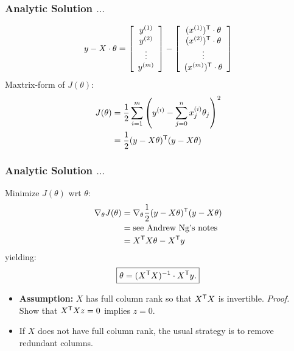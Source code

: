 \documentclass[xcolor=table]{beamer}
\newcommand{\trans}[1]{\ensuremath{#1}^{\scriptsize{\textsf{T}}}}
\begin{document}
\begin{frame}[t]
\frametitle{Analytic Solution $\ldots$}
\[y - X \cdot \theta =  \left [ \begin{array}{c} 
                                    y^{(1)} \\
                                    y^{(2)} \\
                                    \vdots \\
                                    y^{(m)}
                                \end{array}\right ] -
                        \left [ \begin{array}{c}
                                    \trans{(x^{(1)})} \cdot \theta \\
                                    \trans{(x^{(2)})} \cdot \theta \\
                                    \vdots                         \\
                                    \trans{(x^{(m)})} \cdot \theta \\
                                \end{array}
                       \right ]\]
Maxtrix-form of $J(\theta)$:
\begin{equation*}
\begin{split}
    J(\theta) & = \frac{1}{2} \sum_{i = 1}^{m} \left (y^{(i)} - \sum_{j = 0}^{n} 
                    x^{(i)}_j \theta_j \right )^2 \\
              & = \frac{1}{2} \trans{(y - X \theta)} (y - X \theta)
\end{split}
\end{equation*}
\end{frame}

\begin{frame}[t]
\frametitle{Analytic Solution $\ldots$}
Minimize $J(\theta)$ wrt $\theta$:
\begin{equation*}
\begin{split}
    \nabla_{\theta} J(\theta) & = \nabla_{\theta} \frac{1}{2} \trans{(y - X \theta)} (y - X \theta) \\
                              & = \text{see Andrew Ng's notes} \\
                              & = \trans{X} X \theta - \trans{X} y  
\end{split}
\end{equation*}
yielding: 
\[\boxed{\theta = (\trans{X} X)^{-1} \cdot \trans{X}y.}\] 

\pause

\begin{itemize}
    \item \textbf{Assumption:} $X$ has full column rank so that $\trans{X}X$ is invertible. \pause
    \emph{Proof.} Show that $\trans{X} X z = 0$ implies $z = 0$. 

    \pause

    \item If $X$ does not have full column rank, the usual strategy is to remove redundant columns.   
\end{itemize}
\end{frame}
\end{document}
